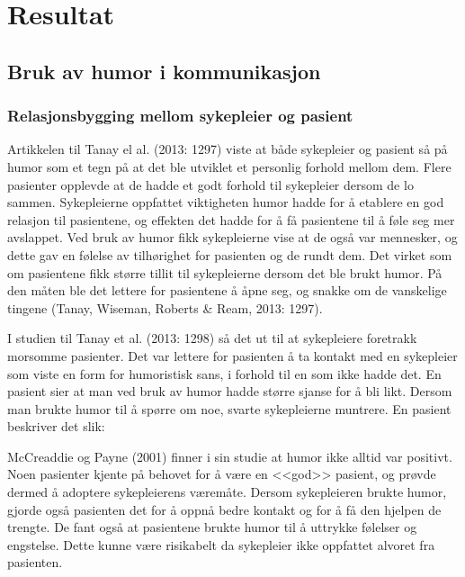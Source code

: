 \chapter{Resultat}

\section{Bruk av humor i kommunikasjon}

\subsection{Relasjonsbygging mellom sykepleier og pasient}

Artikkelen til Tanay el al. (2013: 1297) viste at både sykepleier og pasient så
på humor som et tegn på at det ble utviklet et personlig forhold mellom dem.
Flere pasienter opplevde at de hadde et godt forhold til sykepleier dersom de
lo sammen. Sykepleierne oppfattet viktigheten humor hadde for å etablere en god
relasjon til pasientene, og effekten det hadde for å få pasientene til å føle
seg mer avslappet. Ved bruk av humor fikk sykepleierne vise at de også var
mennesker, og dette gav en følelse av tilhørighet for pasienten og de rundt
dem. Det virket som om pasientene fikk større tillit til sykepleierne dersom
det ble brukt humor. På den måten ble det lettere for pasientene å åpne seg, og
snakke om de vanskelige tingene (Tanay, Wiseman, Roberts \&{} Ream, 2013: 1297).

I studien til Tanay et al. (2013: 1298) så det ut til at sykepleiere foretrakk
morsomme pasienter. Det var lettere for pasienten å ta kontakt med en
sykepleier som viste en form for humoristisk sans, i forhold til en som ikke
hadde det. En pasient sier at man ved bruk av humor hadde større sjanse for å
bli likt. Dersom man brukte humor til å spørre om noe, svarte sykepleierne
muntrere. En pasient beskriver det slik: 

McCreaddie og Payne (2001) finner i sin studie at humor ikke alltid var
positivt. Noen pasienter kjente på behovet for å være en <<god>> pasient, og
prøvde dermed å adoptere sykepleierens væremåte. Dersom sykepleieren brukte
humor, gjorde også pasienten det for å oppnå bedre kontakt og for å få den
hjelpen de trengte. De fant også at pasientene brukte humor til å uttrykke
følelser og engstelse. Dette kunne være risikabelt da sykepleier ikke oppfattet
alvoret fra pasienten.

